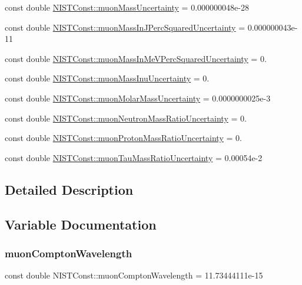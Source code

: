 \begin{DoxyCompactItemize}
\item 
const double \hyperlink{group___muon_ga9e5356c55812a9d313f3d6b5a5eca437}{N\+I\+S\+T\+Const\+::muon\+Mass\+Uncertainty} = 0.\+000000048e-\/28
\item 
const double \hyperlink{group___muon_gacf6e9be254af1b85cc1ee1b0a9a3a2c9}{N\+I\+S\+T\+Const\+::muon\+Mass\+In\+J\+Perc\+Squared\+Uncertainty} = 0.\+000000043e-\/11
\item 
const double \hyperlink{group___muon_ga1958d52051686be59d9e4a7ad3a69fa1}{N\+I\+S\+T\+Const\+::muon\+Mass\+In\+Me\+V\+Perc\+Squared\+Uncertainty} = 0.
\item 
const double \hyperlink{group___muon_ga55f39b59c02eb2265b4d62332643a439}{N\+I\+S\+T\+Const\+::muon\+Mass\+Inu\+Uncertainty} = 0.
\item 
const double \hyperlink{group___muon_gac8084ae83ddad95617db5064d8778c11}{N\+I\+S\+T\+Const\+::muon\+Molar\+Mass\+Uncertainty} = 0.\+0000000025e-\/3
\item 
const double \hyperlink{group___muon_gaf1e3125615d29e354cc1ade185c1831c}{N\+I\+S\+T\+Const\+::muon\+Neutron\+Mass\+Ratio\+Uncertainty} = 0.
\item 
const double \hyperlink{group___muon_ga61cddfc40a08640b83041efd9d4dbbe2}{N\+I\+S\+T\+Const\+::muon\+Proton\+Mass\+Ratio\+Uncertainty} = 0.
\item 
const double \hyperlink{group___muon_gacb8e714cc816309192bb37387da5fa6b}{N\+I\+S\+T\+Const\+::muon\+Tau\+Mass\+Ratio\+Uncertainty} = 0.\+00054e-\/2
\end{DoxyCompactItemize}


\subsection{Detailed Description}


\subsection{Variable Documentation}
\mbox{\label{group___muon_ga344399a1ac3bc2f57614ccdca4f4f1c1}} 
\subsubsection{\texorpdfstring{muon\+Compton\+Wavelength}{muonComptonWavelength}}
{\footnotesize\ttfamily const double N\+I\+S\+T\+Const\+::muon\+Compton\+Wavelength = 11.\+73444111e-\/15}

